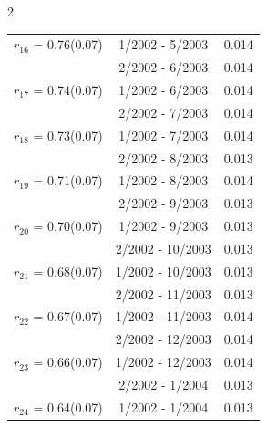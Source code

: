 \begin{multicols}{2}
{\begin{tabular}{ccc}
  $r_{16}$ = 0.76(0.07) &       1/2002 -  5/2003 &        0.014   \vspace{-.10in} \\  
&        2/2002 -  6/2003 &        0.014  \vspace{-.02in} \\ \hline 
  $r_{17}$ = 0.74(0.07) &       1/2002 -  6/2003 &        0.014   \vspace{-.10in} \\  
&        2/2002 -  7/2003 &        0.014  \vspace{-.02in} \\ \hline 
  $r_{18}$ = 0.73(0.07) &       1/2002 -  7/2003 &        0.014   \vspace{-.10in} \\  
&        2/2002 -  8/2003 &        0.013  \vspace{-.02in} \\ \hline 
  $r_{19}$ = 0.71(0.07) &       1/2002 -  8/2003 &        0.014   \vspace{-.10in} \\  
&        2/2002 -  9/2003 &        0.013  \vspace{-.02in} \\ \hline 
  $r_{20}$ = 0.70(0.07) &       1/2002 -  9/2003 &        0.013   \vspace{-.10in} \\  
&        2/2002 - 10/2003 &        0.013  \vspace{-.02in} \\ \hline 
  $r_{21}$ = 0.68(0.07) &       1/2002 - 10/2003 &        0.013   \vspace{-.10in} \\  
&        2/2002 - 11/2003 &        0.013  \vspace{-.02in} \\ \hline 
  $r_{22}$ = 0.67(0.07) &       1/2002 - 11/2003 &        0.014   \vspace{-.10in} \\  
&        2/2002 - 12/2003 &        0.014  \vspace{-.02in} \\ \hline 
  $r_{23}$ = 0.66(0.07) &       1/2002 - 12/2003 &        0.014   \vspace{-.10in} \\  
&        2/2002 -  1/2004 &        0.013  \vspace{-.02in} \\ \hline 
  $r_{24}$ = 0.64(0.07) &       1/2002 -  1/2004 &        0.013   \vspace{-.10in} \\  

\end{tabular}}
\end{multicols}
